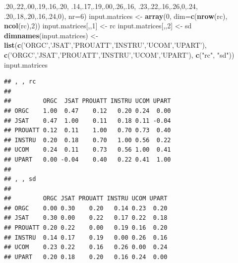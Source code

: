 \documentclass[]{article}
\newenvironment{Shaded}{\begin{snugshade}}{\end{snugshade}}
\newcommand{\KeywordTok}[1]{\textcolor[rgb]{0.13,0.29,0.53}{\textbf{#1}}}
\newcommand{\DataTypeTok}[1]{\textcolor[rgb]{0.13,0.29,0.53}{#1}}
\newcommand{\DecValTok}[1]{\textcolor[rgb]{0.00,0.00,0.81}{#1}}
\newcommand{\StringTok}[1]{\textcolor[rgb]{0.31,0.60,0.02}{#1}}
\newcommand{\NormalTok}[1]{#1}
\begin{document}
\begin{Shaded}
\begin{Highlighting}[]
\NormalTok{              .}\DecValTok{20}\NormalTok{,.}\DecValTok{22}\NormalTok{,.}\DecValTok{00}\NormalTok{,.}\DecValTok{19}\NormalTok{,.}\DecValTok{16}\NormalTok{,.}\DecValTok{20}\NormalTok{,}
\NormalTok{              .}\DecValTok{14}\NormalTok{,.}\DecValTok{17}\NormalTok{,.}\DecValTok{19}\NormalTok{,.}\DecValTok{00}\NormalTok{,.}\DecValTok{26}\NormalTok{,.}\DecValTok{16}\NormalTok{,}
\NormalTok{              .}\DecValTok{23}\NormalTok{,.}\DecValTok{22}\NormalTok{,.}\DecValTok{16}\NormalTok{,.}\DecValTok{26}\NormalTok{,}\DecValTok{0}\NormalTok{,.}\DecValTok{24}\NormalTok{,}
\NormalTok{              .}\DecValTok{20}\NormalTok{,.}\DecValTok{18}\NormalTok{,.}\DecValTok{20}\NormalTok{,.}\DecValTok{16}\NormalTok{,.}\DecValTok{24}\NormalTok{,}\DecValTok{0}\NormalTok{), }\DataTypeTok{nr=}\DecValTok{6}\NormalTok{)}
\NormalTok{input.matrices <-}\StringTok{ }\KeywordTok{array}\NormalTok{(}\DecValTok{0}\NormalTok{, }\DataTypeTok{dim=}\KeywordTok{c}\NormalTok{(}\KeywordTok{nrow}\NormalTok{(rc), }\KeywordTok{ncol}\NormalTok{(rc),}\DecValTok{2}\NormalTok{))}
\NormalTok{input.matrices[,,}\DecValTok{1}\NormalTok{] <-}\StringTok{ }\NormalTok{rc}
\NormalTok{input.matrices[,,}\DecValTok{2}\NormalTok{] <-}\StringTok{ }\NormalTok{sd}
\KeywordTok{dimnames}\NormalTok{(input.matrices) <-}\StringTok{ }\KeywordTok{list}\NormalTok{(}\KeywordTok{c}\NormalTok{(}\StringTok{'ORGC'}\NormalTok{,}\StringTok{'JSAT'}\NormalTok{,}\StringTok{'PROUATT'}\NormalTok{,}\StringTok{'INSTRU'}\NormalTok{,}\StringTok{'UCOM'}\NormalTok{,}\StringTok{'UPART'}\NormalTok{),}
                                 \KeywordTok{c}\NormalTok{(}\StringTok{'ORGC'}\NormalTok{,}\StringTok{'JSAT'}\NormalTok{,}\StringTok{'PROUATT'}\NormalTok{,}\StringTok{'INSTRU'}\NormalTok{,}\StringTok{'UCOM'}\NormalTok{,}\StringTok{'UPART'}\NormalTok{),}
                                 \KeywordTok{c}\NormalTok{(}\StringTok{"rc"}\NormalTok{, }\StringTok{"sd"}\NormalTok{))}
\NormalTok{input.matrices}
\end{Highlighting}
\end{Shaded}

\begin{verbatim}
## , , rc
## 
##         ORGC  JSAT PROUATT INSTRU UCOM UPART
## ORGC    1.00  0.47    0.12   0.20 0.24  0.00
## JSAT    0.47  1.00    0.11   0.18 0.11 -0.04
## PROUATT 0.12  0.11    1.00   0.70 0.73  0.40
## INSTRU  0.20  0.18    0.70   1.00 0.56  0.22
## UCOM    0.24  0.11    0.73   0.56 1.00  0.41
## UPART   0.00 -0.04    0.40   0.22 0.41  1.00
## 
## , , sd
## 
##         ORGC JSAT PROUATT INSTRU UCOM UPART
## ORGC    0.00 0.30    0.20   0.14 0.23  0.20
## JSAT    0.30 0.00    0.22   0.17 0.22  0.18
## PROUATT 0.20 0.22    0.00   0.19 0.16  0.20
## INSTRU  0.14 0.17    0.19   0.00 0.26  0.16
## UCOM    0.23 0.22    0.16   0.26 0.00  0.24
## UPART   0.20 0.18    0.20   0.16 0.24  0.00
\end{verbatim}
\end{document}
